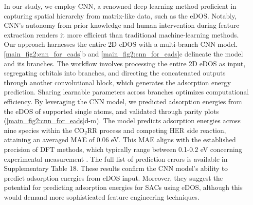 In our study, we employ CNN, a renowned deep learning method proficient in capturing spatial hierarchy from matrix-like data, such as the eDOS.
Notably, CNN's autonomy from prior knowledge and human intervention during feature extraction renders it more efficient than traditional machine-learning methods.
Our approach harnesses the entire 2D eDOS with a multi-branch CNN model.
\cref{main_fig2:cnn_for_eads}b and \cref{main_fig2:cnn_for_eads}c delineate the model and its branches.
The workflow involves processing the entire 2D eDOS as input, segregating orbitals into branches, and directing the concatenated outputs through another convolutional block, which generates the adsorption energy prediction.
Sharing learnable parameters across branches optimizes computational efficiency.
By leveraging the CNN model, we predicted adsorption energies from the eDOS of supported single atoms, and validated through parity plots (\cref{main_fig2:cnn_for_eads}d-m).
The model predicts adsorption energies across nine species within the CO$_2$RR process and competing HER side reaction, attaining an averaged MAE of 0.06 eV.
This MAE aligns with the established precision of DFT methods, which typically range between 0.1-0.2 eV concerning experimental measurement \cite{wellendorff2015benchmark, kirklin2015open, lejaeghere2016reproducibility}.
The full list of prediction errors is available in Supplementary Table 18.
These results confirm the CNN model's ability to predict adsorption energies from eDOS input.
Moreover, they suggest the potential for predicting adsorption energies for SACs using eDOS, although this would demand more sophisticated feature engineering techniques.

